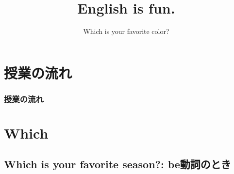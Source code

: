 \documentclass[aspectratio=169,xcolor={dvipsnames,table}]{beamer}
\title{English is fun.}
\subtitle{Which is your favorite color?}
\author{}
\institute[]{}
\date[]
\begin{document}
\begin{frame}[plain]
  \titlepage
\end{frame}


\section*{授業の流れ}
\begin{frame}[plain]
  \frametitle{授業の流れ}
  \tableofcontents
\end{frame}



\section{Which}

\subsection{Which is your favorite season?: be動詞のとき}
%
%
%
%
%
%
%
%
%
%
%
%
%
\end{document}
